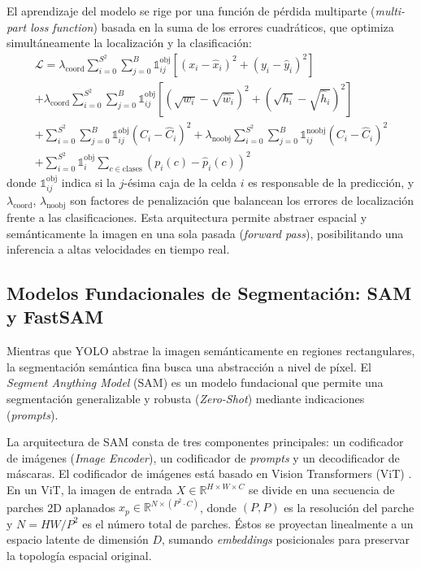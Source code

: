 El aprendizaje del modelo se rige por una función de pérdida multiparte (\textit{multi-part loss function}) basada en la suma de los errores cuadráticos, que optimiza simultáneamente la localización y la clasificación:
\begin{equation}
\begin{split}
\mathcal{L} = \lambda_{\text{coord}} \sum_{i=0}^{S^2} \sum_{j=0}^{B} \mathbb{1}_{ij}^{\text{obj}} \left[ (x_i - \hat{x}_i)^2 + (y_i - \hat{y}_i)^2 \right] \\
+ \lambda_{\text{coord}} \sum_{i=0}^{S^2} \sum_{j=0}^{B} \mathbb{1}_{ij}^{\text{obj}} \left[ (\sqrt{w_i} - \sqrt{\hat{w}_i})^2 + (\sqrt{h_i} - \sqrt{\hat{h}_i})^2 \right] \\
+ \sum_{i=0}^{S^2} \sum_{j=0}^{B} \mathbb{1}_{ij}^{\text{obj}} (C_i - \hat{C}_i)^2 + \lambda_{\text{noobj}} \sum_{i=0}^{S^2} \sum_{j=0}^{B} \mathbb{1}_{ij}^{\text{noobj}} (C_i - \hat{C}_i)^2 \\
+ \sum_{i=0}^{S^2} \mathbb{1}_{i}^{\text{obj}} \sum_{c \in \text{clases}} (p_i(c) - \hat{p}_i(c))^2
\end{split}
\end{equation}
donde $\mathbb{1}_{ij}^{\text{obj}}$ indica si la $j$-ésima caja de la celda $i$ es responsable de la predicción, y $\lambda_{\text{coord}}$, $\lambda_{\text{noobj}}$ son factores de penalización que balancean los errores de localización frente a las clasificaciones. Esta arquitectura permite abstraer espacial y semánticamente la imagen en una sola pasada (\textit{forward pass}), posibilitando una inferencia a altas velocidades en tiempo real.

\subsection{Modelos Fundacionales de Segmentación: SAM y FastSAM}

Mientras que YOLO abstrae la imagen semánticamente en regiones rectangulares, la segmentación semántica fina busca una abstracción a nivel de píxel. El \textit{Segment Anything Model} (SAM) \cite{kirillov2023sam} es un modelo fundacional que permite una segmentación generalizable y robusta (\textit{Zero-Shot}) mediante indicaciones (\textit{prompts}). 

La arquitectura de SAM consta de tres componentes principales: un codificador de imágenes (\textit{Image Encoder}), un codificador de \textit{prompts} y un decodificador de máscaras. El codificador de imágenes está basado en Vision Transformers (ViT) \cite{dosovitskiy2020image}. En un ViT, la imagen de entrada $X \in \mathbb{R}^{H \times W \times C}$ se divide en una secuencia de parches 2D aplanados $x_p \in \mathbb{R}^{N \times (P^2 \cdot C)}$, donde $(P, P)$ es la resolución del parche y $N = HW/P^2$ es el número total de parches. Éstos se proyectan linealmente a un espacio latente de dimensión $D$, sumando \textit{embeddings} posicionales para preservar la topología espacial original.

